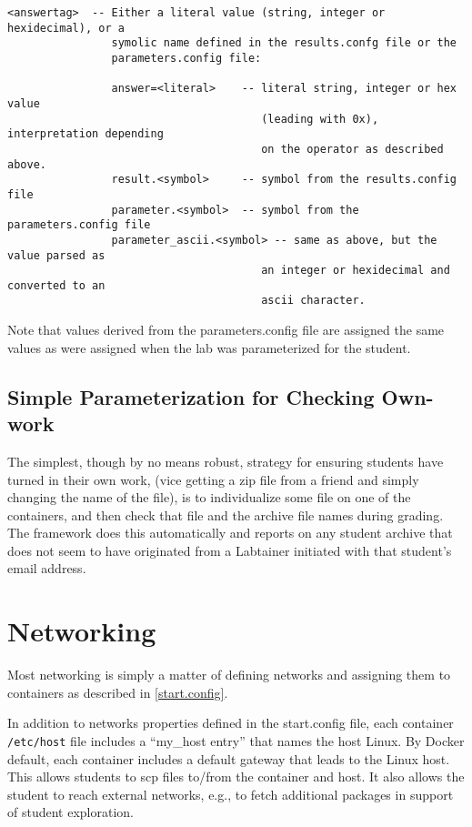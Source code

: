 \documentclass[12pt]{article}
\begin{document}
\begin{verbatim}
<answertag>  -- Either a literal value (string, integer or hexidecimal), or a 
                symolic name defined in the results.confg file or the 
                parameters.config file:
 
                answer=<literal>    -- literal string, integer or hex value 
                                       (leading with 0x), interpretation depending 
                                       on the operator as described above.
                result.<symbol>     -- symbol from the results.config file
                parameter.<symbol>  -- symbol from the parameters.config file
                parameter_ascii.<symbol> -- same as above, but the value parsed as 
                                       an integer or hexidecimal and converted to an 
                                       ascii character.

\end{verbatim}
         Note that values derived from the parameters.config file are assigned the same values as
         were assigned when the lab was parameterized for the student.

\subsection{Simple Parameterization for Checking Own-work}
The simplest, though by no means robust, strategy for ensuring students
have turned in their own work, (vice getting a zip file from a friend and simply
changing the name of the file), is to individualize some file on one of the containers,
and then check that file and the archive file names during grading.  The framework does
this automatically and reports on any student archive that does not seem to have
originated from a Labtainer initiated with that student's email address.

\section{Networking}
Most networking is simply a matter of defining networks and assigning them to containers
as described in \ref{start.config}.  

In addition to networks properties defined in the
start.config file, each container \texttt{/etc/host} file includes a ``my\_host entry'' that names
the host Linux.  By Docker default, each container includes a default gateway that
leads to the Linux host.  This allows students to scp files to/from the container and host.
It also allows the student to reach external networks, e.g., to fetch additional packages in
support of student exploration.
\end{document}
